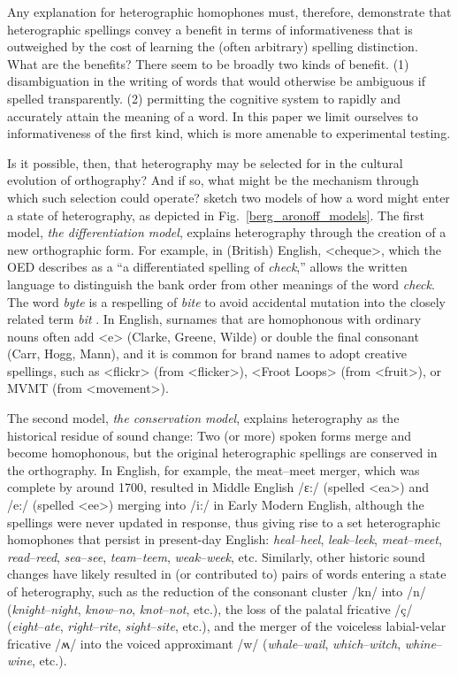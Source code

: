 \documentclass[doc,biblatex]{apa7}
\begin{document}
Any explanation for heterographic homophones must, therefore, demonstrate that heterographic spellings convey a benefit in terms of informativeness that is outweighed by the cost of learning the (often arbitrary) spelling distinction. What are the benefits? There seem to be broadly two kinds of benefit. (1) disambiguation in the writing of words that would otherwise be ambiguous if spelled transparently. (2) permitting the cognitive system to rapidly and accurately attain the meaning of a word. In this paper we limit ourselves to informativeness of the first kind, which is more amenable to experimental testing.

Is it possible, then, that heterography may be selected for in the cultural evolution of orthography? And if so, what might be the mechanism through which such selection could operate? \textcite[pp.~325--326]{Berg:2021} sketch two models of how a word might enter a state of heterography, as depicted in Fig.~\ref{berg_aronoff_models}. The first model, \textit{the differentiation model}, explains heterography through the creation of a new orthographic form. For example, in (British) English, <cheque>, which the OED describes as a ``a differentiated spelling of \textit{check},'' allows the written language to distinguish the bank order from other meanings of the word \textit{check}. The word \textit{byte} is a respelling of \textit{bite} to avoid accidental mutation into the closely related term \textit{bit} \parencite{Buchholz:1977}. In English, surnames that are homophonous with ordinary nouns often add <e> (Clarke, Greene, Wilde) or double the final consonant (Carr, Hogg, Mann), and it is common for brand names to adopt creative spellings, such as <flickr> (from <flicker>), <Froot Loops> (from <fruit>), or MVMT (from <movement>).

The second model, \textit{the conservation model}, explains heterography as the historical residue of sound change: Two (or more) spoken forms merge and become homophonous, but the original heterographic spellings are conserved in the orthography. In English, for example, the meat--meet merger, which was complete by around 1700, resulted in Middle English /ɛ:/ (spelled <ea>) and /e:/ (spelled <ee>) merging into /i:/ in Early Modern English, although the spellings were never updated in response, thus giving rise to a set heterographic homophones that persist in present-day English: \textit{heal}--\textit{heel}, \textit{leak}--\textit{leek}, \textit{meat}--\textit{meet}, \textit{read}--\textit{reed}, \textit{sea}--\textit{see}, \textit{team}--\textit{teem}, \textit{weak}--\textit{week}, etc. Similarly, other historic sound changes have likely resulted in (or contributed to) pairs of words entering a state of heterography, such as the reduction of the consonant cluster /kn/ into /n/ (\textit{knight}--\textit{night}, \textit{know}--\textit{no}, \textit{knot}--\textit{not}, etc.), the loss of the palatal fricative /ç/ (\textit{eight}--\textit{ate}, \textit{right}--\textit{rite}, \textit{sight}--\textit{site}, etc.), and the merger of the voiceless labial-velar fricative /ʍ/ into the voiced approximant /w/ (\textit{whale}--\textit{wail}, \textit{which}--\textit{witch}, \textit{whine}--\textit{wine}, etc.).
\end{document}
